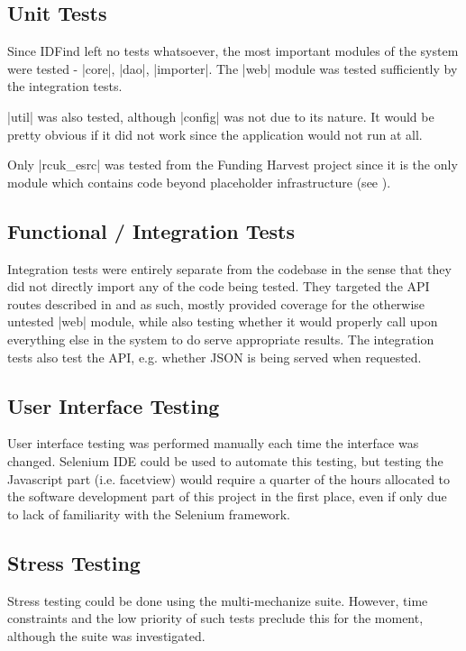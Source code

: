 \subsection{Unit Tests}
Since IDFind left no tests whatsoever, the most important modules of the system were tested - |core|, |dao|, |importer|. The |web| module was tested sufficiently by the integration tests.

|util| was also tested, although |config| was not due to its nature. It would be pretty obvious if it did not work since the application would not run at all. 

Only |rcuk_esrc| was tested from the Funding Harvest project since it is the only module which contains code beyond placeholder infrastructure (see ).

\subsection{Functional / Integration Tests}
Integration tests were entirely separate from the codebase in the sense that they did not directly import any of the code being tested. They targeted the API routes described in  and as such, mostly provided coverage for the otherwise untested |web| module, while also testing whether it would properly call upon everything else in the system to do serve appropriate results. The integration tests also test the API, e.g. whether JSON is being served when requested.

\subsection{User Interface Testing}
User interface testing was performed manually each time the interface was changed. Selenium IDE \cite{selenium} could be used to automate this testing, but testing the Javascript part (i.e. facetview) would require a quarter of the hours allocated to the software development part of this project in the first place, even if only due to lack of familiarity with the Selenium framework.

\subsection{Stress Testing}
Stress testing could be done using the multi-mechanize \cite{multi-mechanize} suite. However, time constraints and the low priority of such tests preclude this for the moment, although the suite was investigated.

